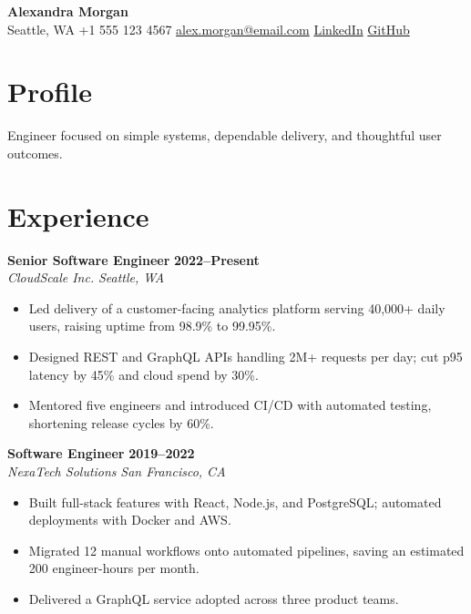 \documentclass[10pt,letterpaper]{article}
\begin{document}
\begin{center}
{\fontsize{22}{26}\selectfont\bfseries Alexandra Morgan}\\[3pt]
{\small Seattle, WA \textbar{} +1 555 123 4567 \textbar{} \href{mailto:alex.morgan@email.com}{alex.morgan@email.com} \textbar{} \href{https://www.linkedin.com/in/alexmorgan}{LinkedIn} \textbar{} \href{https://github.com/alexmorgan}{GitHub}}
\end{center}

\section{Profile}
\noindent Engineer focused on simple systems, dependable delivery, and thoughtful user outcomes.

\section{Experience}
\noindent\textbf{Senior Software Engineer} \hfill \textbf{2022--Present}\\
\textit{CloudScale Inc.} \hfill \textit{Seattle, WA}\\[2pt]
\begin{itemize}
\item Led delivery of a customer-facing analytics platform serving 40,000+ daily users, raising uptime from 98.9\% to 99.95\%.
\item Designed REST and GraphQL APIs handling 2M+ requests per day; cut p95 latency by 45\% and cloud spend by 30\%.
\item Mentored five engineers and introduced CI/CD with automated testing, shortening release cycles by 60\%.
\end{itemize}
\vspace{5pt}
\noindent\textbf{Software Engineer} \hfill \textbf{2019--2022}\\
\textit{NexaTech Solutions} \hfill \textit{San Francisco, CA}\\[2pt]
\begin{itemize}
\item Built full-stack features with React, Node.js, and PostgreSQL; automated deployments with Docker and AWS.
\item Migrated 12 manual workflows onto automated pipelines, saving an estimated 200 engineer-hours per month.
\item Delivered a GraphQL service adopted across three product teams.
\end{itemize}
\vspace{5pt}
\end{document}

